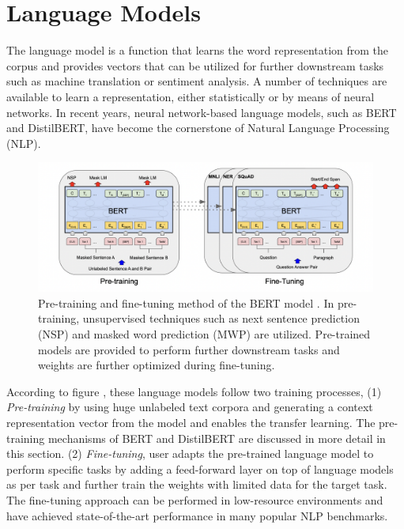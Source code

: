 \documentclass[%
	BCOR=8mm, %
	DIV=12,
	toc=bibliography, %
	toc=listof, %
	oneside, %
	egregdoesnotlikesansseriftitles, %
	]{scrbook}
\begin{document}
\section{Language Models}
\label{section:langaugemodels}
The language model is a function that learns the word representation from the corpus and provides vectors that can be utilized for further downstream tasks such as machine translation or sentiment analysis. A number of techniques are available to learn a representation, either statistically or by means of neural networks. In recent years, neural network-based language models, such as BERT and DistilBERT, have become the cornerstone of Natural Language Processing (NLP). 
\begin{figure}[H]
    \centering
    \includegraphics[width=0.7\linewidth]{img/pre_fintune.png}
    \caption[Diagram of of pre-training and fine-tuning of BERT model]{ \small Pre-training and fine-tuning method of the BERT model \cite{devlin_bert_2019-1}. In pre-training, unsupervised techniques such as next sentence prediction (NSP) and masked word prediction (MWP) are utilized. Pre-trained models are provided to perform further downstream tasks and weights are further optimized during fine-tuning.}
    \label{fig:prefintune}
\end{figure}
According to figure , these language models follow two training processes, (1)\textit{ Pre-training} by using huge unlabeled text corpora and generating a context representation vector from the model \cite{devlin_bert_2019-1}  and enables the transfer learning. The pre-training mechanisms of BERT and DistilBERT are discussed in more detail in this section. (2) \textit{Fine-tuning}, user adapts the pre-trained language model to perform specific tasks by adding a feed-forward layer on top of language models as per task and further train the weights with limited data for the target task. The fine-tuning approach can be performed in low-resource environments and have achieved state-of-the-art performance in many popular NLP benchmarks.
\end{document}
